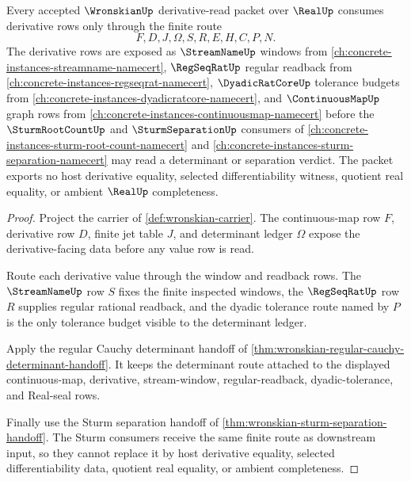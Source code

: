 \begin{theorem}
\label{thm:wronskian-regseqrat-window-dependency}
Every accepted $\WronskianUp$ derivative-read packet over $\RealUp$ consumes derivative rows only through the finite route
$$
F,D,J,\Omega,S,R,E,H,C,P,N .
$$
The derivative rows are exposed as $\StreamNameUp$ windows from \autoref{ch:concrete-instances-streamname-namecert}, $\RegSeqRatUp$ regular readback from \autoref{ch:concrete-instances-regseqrat-namecert}, $\DyadicRatCoreUp$ tolerance budgets from \autoref{ch:concrete-instances-dyadicratcore-namecert}, and $\ContinuousMapUp$ graph rows from \autoref{ch:concrete-instances-continuousmap-namecert} before the $\SturmRootCountUp$ and $\SturmSeparationUp$ consumers of \autoref{ch:concrete-instances-sturm-root-count-namecert} and \autoref{ch:concrete-instances-sturm-separation-namecert} may read a determinant or separation verdict. The packet exports no host derivative equality, selected differentiability witness, quotient real equality, or ambient $\RealUp$ completeness.
\end{theorem}
\begin{proof}
Project the carrier of \autoref{def:wronskian-carrier}. The continuous-map row $F$, derivative row $D$, finite jet table $J$, and determinant ledger $\Omega$ expose the derivative-facing data before any value row is read.

Route each derivative value through the window and readback rows. The $\StreamNameUp$ row $S$ fixes the finite inspected windows, the $\RegSeqRatUp$ row $R$ supplies regular rational readback, and the dyadic tolerance route named by $P$ is the only tolerance budget visible to the determinant ledger.

Apply the regular Cauchy determinant handoff of \autoref{thm:wronskian-regular-cauchy-determinant-handoff}. It keeps the determinant route attached to the displayed continuous-map, derivative, stream-window, regular-readback, dyadic-tolerance, and Real-seal rows.

Finally use the Sturm separation handoff of \autoref{thm:wronskian-sturm-separation-handoff}. The Sturm consumers receive the same finite route as downstream input, so they cannot replace it by host derivative equality, selected differentiability data, quotient real equality, or ambient completeness.
\end{proof}

